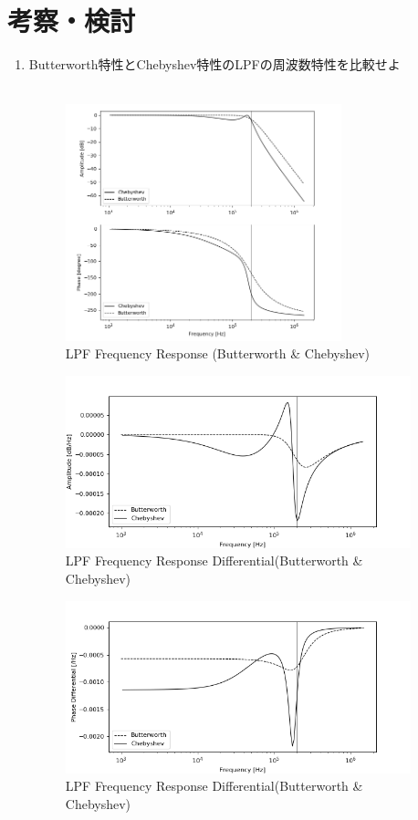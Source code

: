\documentclass[a4j,dvipdfmx]{article}
\begin{document}
\section{考察・検討}
\begin{enumerate}[label={(\arabic*)}]
\item Butterworth特性とChebyshev特性のLPFの周波数特性を比較せよ\\~\\

\begin{figure}[H]
    \begin{center}
     	\includegraphics[width=8cm]{LPF_BC_f.png}
        \caption{LPF Frequency Response (Butterworth \& Chebyshev)}
    \end{center}
\end{figure}

\begin{figure}[H]
    \begin{center}
     	\includegraphics[width=10cm]{BC_f_amp_differential.png}
        \caption{LPF Frequency Response Differential(Butterworth \& Chebyshev)}
    \end{center}
\end{figure}

\begin{figure}[H]
    \begin{center}
     	\includegraphics[width=10cm]{BC_f_phase_differential.png}
        \caption{LPF Frequency Response Differential(Butterworth \& Chebyshev)}
    \end{center}
\end{figure}


\end{enumerate}
\end{document}

